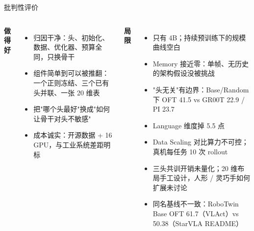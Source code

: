 \documentclass[aspectratio=169,10pt]{beamer}
\newcommand{\pos}[1]{\textcolor{positive}{#1}}
\newcommand{\con}[1]{\textcolor{negative}{#1}}
\begin{document}
\begin{frame}{批判性评价}
  \begin{columns}[T]
    \textbf{\pos{做得好}}
    \begin{itemize}
      \item 归因干净：头、初始化、数据、优化器、预算全同，只换骨干
      \item 组件简单到可以被推翻：一个正则冻结、三个已有头并联、一张 20 维表
      \item 把"哪个头最好"换成"如何让骨干对头不敏感"
      \item 成本诚实：开源数据 + 16 GPU，与工业系统差距明标
    \end{itemize}
    \textbf{\con{局限}}
    \begin{itemize}
      \item 只有 4B；持续预训练下的规模曲线空白
      \item Memory 接近零：单帧、无历史的架构假设没被挑战
      \item "头无关"有边界：Base/Random 下 OFT 41.5 vs GR00T 22.9 / PI 23.7
      \item Language 维度掉 5.5 点
      \item Data Scaling 对比算力不可控；真机每任务 10 次 rollout
      \item 三头共训开销未量化；20 维布局手工设计，人形 / 灵巧手如何扩展未讨论
      \item 同名基线不一致：RoboTwin Base OFT 61.7（VLAct）vs 50.38（StarVLA README）
    \end{itemize}
  \end{columns}
\end{frame}

\end{document}
